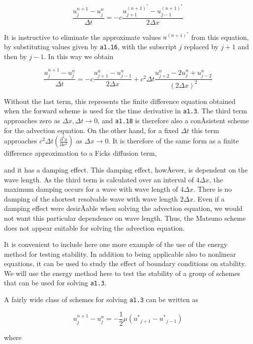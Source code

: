 {\[\frac{u_{j}^{n + 1} - u_{j}^{n}}{\Delta t} =
- c\frac{u_{j + 1}^{\left( n + 1 \right)^{*}} - u_{j - 1}^{\left( n + 1 \right)^{*}}}{2\Delta x}\]}

It is instructive to eliminate the approximate values
\(u^{\left( n + 1 \right)^{*}}\) from this equation, by substituting
values given by \texttt{a1.16}, with the subscript \(j\) replaced by
\(j + 1\) and then by \( j - 1\). In this way we obtain

{\[\frac{u_{j}^{n + 1} - u_{j}^{n}}{\Delta t} =
- c\frac{u_{j + 1}^{n} - u_{j - 1}^{n}}{2\Delta x} +
c^{2}\Delta t\frac{u_{j + 2}^{n} - 
{2u}_{j}^{n} + u_{j - 2}^{n}}{\left( 2\Delta x \right)^{2}}\]}

Without the last term, this represents the finite difference equation
obtained when the forward scheme is used for the time derivative in
\texttt{a1.3}. The third term approaches zero as
\(\Delta x,\Delta t \rightarrow 0\), and \texttt{a1.18} is therefore
also a conÂ­sistent scheme for the advection equation. On the other hand,
for a fixed \(\Delta t\) this term approaches
\(c^{2}\Delta t\left( \frac{\partial^{2}u}{\partial x^{2}} \right)\) as
\(\Delta x \rightarrow 0\). It is therefore of the same form as a finite
difference approximation to a Fick\textquotesingle s diffusion term,

and it has a damping effect. This damping effect, howÂ­ever, is dependent
on the wave length. As the third term is calculated over an interval of
\(4\Delta x\), the maximum damping occurs for a wave with wave length of
\(4\Delta x\). There is no damping of the shortest resolvable wave with
wave length \(2\Delta x\). Even if a damping effect were desirÂ­able when
solving the advection equation, we would not want this particular
dependence on wave length. Thus, the Matsuno scheme does not appear
suitable for solving the advection equation.

It is convenient to include here one more example of the use of the
energy method for testing stability. In addition to being applicable
also to nonlinear equations, it can be used to study the effect of
boundary conditions on stability. We will use the energy method here to
test the stability of a group of schemes that can be used for solving
\texttt{a1.3}.

A fairly wide class of schemes for solving \texttt{a1.3} can be written
as

{\[u_{j}^{n + 1} - u_{j}^{n} = - \frac{1}{2}\mu\left( {u^{*}}_{j + 1} - {u^{*}}_{j - 1} \right)\]}

where

